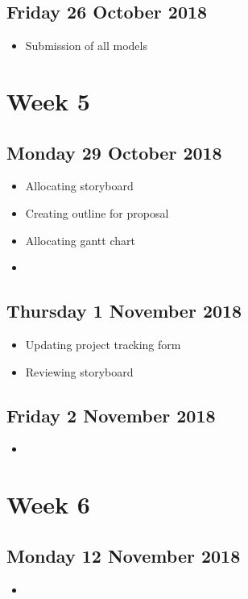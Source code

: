 \subsection*{Friday 26 October 2018}
\begin{itemize}
	\item Submission of all models
\end{itemize}

\section*{Week 5}
\subsection*{Monday 29 October 2018}
\begin{itemize}
	\item Allocating storyboard
	\item Creating outline for proposal
	\item Allocating gantt chart
	\item 
\end{itemize}

\subsection*{Thursday 1 November 2018}
\begin{itemize}
	\item Updating project tracking form
	\item Reviewing storyboard
\end{itemize}

\subsection*{Friday 2 November 2018}
\begin{itemize}
	\item
\end{itemize}

\section*{Week 6}
\subsection*{Monday 12 November 2018}
\begin{itemize}
	\item
\end{itemize}

